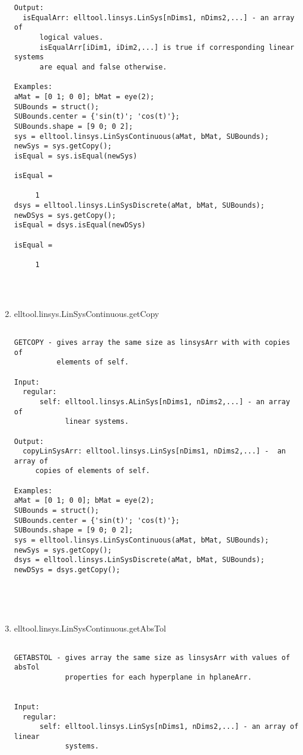 \begin{enumerate}
\begin{lstlisting}
Output:
  isEqualArr: elltool.linsys.LinSys[nDims1, nDims2,...] - an array of
      logical values.
      isEqualArr[iDim1, iDim2,...] is true if corresponding linear systems
      are equal and false otherwise.

Examples:
aMat = [0 1; 0 0]; bMat = eye(2);
SUBounds = struct();
SUBounds.center = {'sin(t)'; 'cos(t)'};
SUBounds.shape = [9 0; 0 2];
sys = elltool.linsys.LinSysContinuous(aMat, bMat, SUBounds);
newSys = sys.getCopy();
isEqual = sys.isEqual(newSys)

isEqual =

     1
dsys = elltool.linsys.LinSysDiscrete(aMat, bMat, SUBounds);
newDSys = sys.getCopy();
isEqual = dsys.isEqual(newDSys)

isEqual =

     1




\end{lstlisting}
\fontfamily{\familydefault}
\selectfont
\item {elltool.linsys.LinSysContinuous.getCopy}
\selectfont
\begin{lstlisting}

GETCOPY - gives array the same size as linsysArr with with copies of
          elements of self.

Input:
  regular:
      self: elltool.linsys.ALinSys[nDims1, nDims2,...] - an array of
            linear systems.

Output:
  copyLinSysArr: elltool.linsys.LinSys[nDims1, nDims2,...] -  an array of
     copies of elements of self.

Examples:
aMat = [0 1; 0 0]; bMat = eye(2);
SUBounds = struct();
SUBounds.center = {'sin(t)'; 'cos(t)'};
SUBounds.shape = [9 0; 0 2];
sys = elltool.linsys.LinSysContinuous(aMat, bMat, SUBounds);
newSys = sys.getCopy();
dsys = elltool.linsys.LinSysDiscrete(aMat, bMat, SUBounds);
newDSys = dsys.getCopy();





\end{lstlisting}
\fontfamily{\familydefault}
\selectfont
\item {elltool.linsys.LinSysContinuous.getAbsTol}
\selectfont
\begin{lstlisting}

GETABSTOL - gives array the same size as linsysArr with values of absTol
            properties for each hyperplane in hplaneArr.


Input:
  regular:
      self: elltool.linsys.LinSys[nDims1, nDims2,...] - an array of linear
            systems.


\end{lstlisting}
\end{enumerate}
